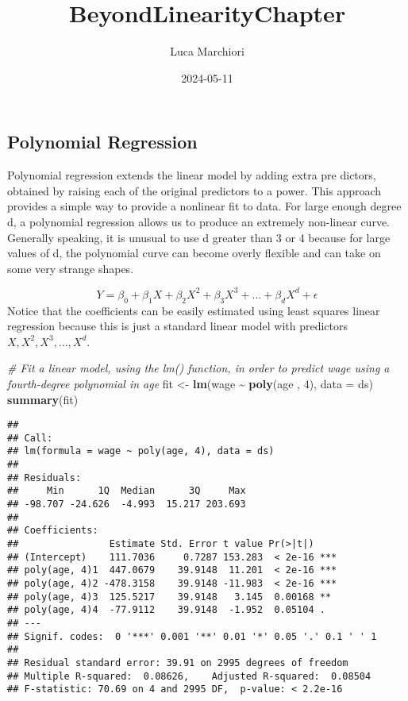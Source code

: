 \documentclass[
]{article}
\title{BeyondLinearityChapter}
\author{Luca Marchiori}
\date{2024-05-11}
\newenvironment{Shaded}{\begin{snugshade}}{\end{snugshade}}
\newcommand{\AttributeTok}[1]{\textcolor[rgb]{0.13,0.29,0.53}{#1}}
\newcommand{\CommentTok}[1]{\textcolor[rgb]{0.56,0.35,0.01}{\textit{#1}}}
\newcommand{\DecValTok}[1]{\textcolor[rgb]{0.00,0.00,0.81}{#1}}
\newcommand{\FunctionTok}[1]{\textcolor[rgb]{0.13,0.29,0.53}{\textbf{#1}}}
\newcommand{\NormalTok}[1]{#1}
\newcommand{\OtherTok}[1]{\textcolor[rgb]{0.56,0.35,0.01}{#1}}
\newcommand{\SpecialCharTok}[1]{\textcolor[rgb]{0.81,0.36,0.00}{\textbf{#1}}}
\begin{document}
\maketitle

\hypertarget{polynomial-regression}{%
\subsection{Polynomial Regression}\label{polynomial-regression}}

Polynomial regression extends the linear model by adding extra pre
dictors, obtained by raising each of the original predictors to a power.
This approach provides a simple way to provide a nonlinear fit to data.
For large enough degree d, a polynomial regression allows us to produce
an extremely non-linear curve. Generally speaking, it is unusual to use
d greater than 3 or 4 because for large values of d, the polynomial
curve can become overly flexible and can take on some very strange
shapes.

\[
Y = \beta_0 + \beta_1X + \beta_2X^2 + \beta_3X^3 + ... + \beta_dX^d + \epsilon
\] Notice that the coefficients can be easily estimated using least
squares linear regression because this is just a standard linear model
with predictors \(X, X^2, X^3, ..., X^d\).

\begin{Shaded}
\begin{Highlighting}[]
\CommentTok{\# Fit a linear model, using the lm() function, in order to predict wage using a fourth{-}degree polynomial in age}
\NormalTok{fit }\OtherTok{\textless{}{-}} \FunctionTok{lm}\NormalTok{(wage }\SpecialCharTok{\textasciitilde{}} \FunctionTok{poly}\NormalTok{(age , }\DecValTok{4}\NormalTok{), }\AttributeTok{data =}\NormalTok{ ds)}
\FunctionTok{summary}\NormalTok{(fit)}
\end{Highlighting}
\end{Shaded}

\begin{verbatim}
## 
## Call:
## lm(formula = wage ~ poly(age, 4), data = ds)
## 
## Residuals:
##     Min      1Q  Median      3Q     Max 
## -98.707 -24.626  -4.993  15.217 203.693 
## 
## Coefficients:
##                Estimate Std. Error t value Pr(>|t|)    
## (Intercept)    111.7036     0.7287 153.283  < 2e-16 ***
## poly(age, 4)1  447.0679    39.9148  11.201  < 2e-16 ***
## poly(age, 4)2 -478.3158    39.9148 -11.983  < 2e-16 ***
## poly(age, 4)3  125.5217    39.9148   3.145  0.00168 ** 
## poly(age, 4)4  -77.9112    39.9148  -1.952  0.05104 .  
## ---
## Signif. codes:  0 '***' 0.001 '**' 0.01 '*' 0.05 '.' 0.1 ' ' 1
## 
## Residual standard error: 39.91 on 2995 degrees of freedom
## Multiple R-squared:  0.08626,    Adjusted R-squared:  0.08504 
## F-statistic: 70.69 on 4 and 2995 DF,  p-value: < 2.2e-16
\end{verbatim}
\end{document}
